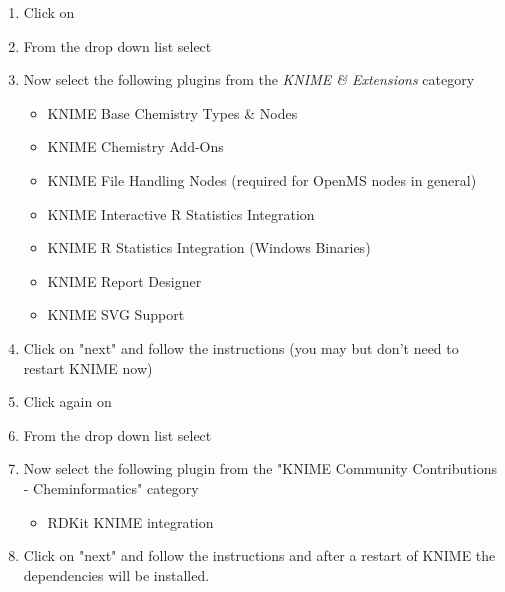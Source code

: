 \begin{enumerate}
\item Click on 
\item From the  drop down list select \menu{\KnimeUpdateSite}
\item Now select the following plugins from the \textit{KNIME \& Extensions} category
    \begin{itemize}
    \item KNIME Base Chemistry Types \& Nodes
    \item KNIME Chemistry Add-Ons
    \item KNIME File Handling Nodes (required for OpenMS nodes in general)
    \item KNIME Interactive R Statistics Integration
    \item KNIME R Statistics Integration (Windows Binaries)
    \item KNIME Report Designer
    \item KNIME SVG Support
    \end{itemize}
\item Click on "next" and follow the instructions (you may but don't need to restart KNIME now)
\item Click again on 
\item From the  drop down list select \\\menu{\KnimeTrustedSite}
\item Now select the following plugin from the "KNIME Community Contributions - Cheminformatics" category 	
    \begin{itemize}
    \item     RDKit KNIME integration
    \end{itemize}	
\item Click on "next" and follow the instructions and after a restart of KNIME the dependencies will be installed.
\end{enumerate}

